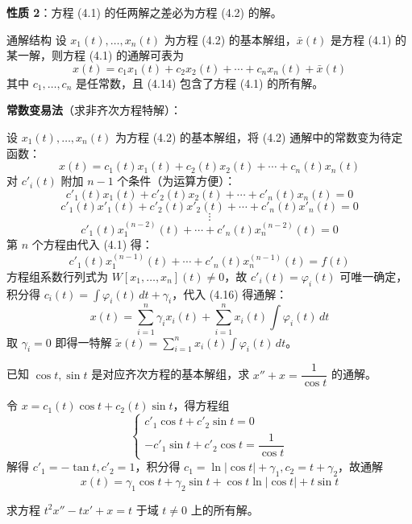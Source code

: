 \textbf{性质 2}：方程 (4.1) 的任两解之差必为方程 (4.2) 的解。

\begin{myTheorem}{通解结构}
设 $x_1(t), \ldots, x_n(t)$ 为方程 (4.2) 的基本解组，$\bar{x}(t)$ 是方程 (4.1) 的某一解，则方程 (4.1) 的通解可表为
\begin{equation}x(t) = c_1x_1(t) + c_2x_2(t) + \cdots + c_nx_n(t) + \bar{x}(t) \tag{4.14}\end{equation}
其中 $c_1, \ldots, c_n$ 是任常数，且 (4.14) 包含了方程 (4.1) 的所有解。
\end{myTheorem}

\textbf{常数变易法}（求非齐次方程特解）：

设 $x_1(t), \ldots, x_n(t)$ 为方程 (4.2) 的基本解组，将 (4.2) 通解中的常数变为待定函数：
\begin{equation}x(t) = c_1(t)x_1(t) + c_2(t)x_2(t) + \cdots + c_n(t)x_n(t) \tag{4.16}\end{equation}
对 $c'_i(t)$ 附加 $n-1$ 个条件（为运算方便）：
$$c'_1(t)x_1(t) + c'_2(t)x_2(t) + \cdots + c'_n(t)x_n(t) = 0$$
$$c'_1(t)x'_1(t) + c'_2(t)x'_2(t) + \cdots + c'_n(t)x'_n(t) = 0$$
$$\vdots$$
$$c'_1(t)x_1^{(n-2)}(t) + \cdots + c'_n(t)x_n^{(n-2)}(t) = 0$$
第 $n$ 个方程由代入 (4.1) 得：
$$c'_1(t)x_1^{(n-1)}(t) + \cdots + c'_n(t)x_n^{(n-1)}(t) = f(t)$$
方程组系数行列式为 $W[x_1, \ldots, x_n](t) \neq 0$，故 $c'_i(t) = \varphi_i(t)$ 可唯一确定，积分得 $c_i(t) = \int \varphi_i(t)\,dt + \gamma_i$，代入 (4.16) 得通解：
$$x(t) = \sum_{i=1}^{n} \gamma_i x_i(t) + \sum_{i=1}^{n} x_i(t)\int \varphi_i(t)\,dt$$
取 $\gamma_i = 0$ 即得一特解 $\tilde{x}(t) = \sum_{i=1}^{n} x_i(t)\int \varphi_i(t)\,dt$。

\begin{example}
已知 $\cos t, \sin t$ 是对应齐次方程的基本解组，求 $x'' + x = \dfrac{1}{\cos t}$ 的通解。
\end{example}

\begin{solution}
令 $x = c_1(t)\cos t + c_2(t)\sin t$，得方程组
$$\begin{cases} c'_1\cos t + c'_2\sin t = 0 \\ -c'_1\sin t + c'_2\cos t = \dfrac{1}{\cos t} \end{cases}$$
解得 $c'_1 = -\tan t, c'_2 = 1$，积分得 $c_1 = \ln|\cos t| + \gamma_1, c_2 = t + \gamma_2$，故通解
$$x(t) = \gamma_1\cos t + \gamma_2\sin t + \cos t\ln|\cos t| + t\sin t$$
\end{solution}

\begin{example}
求方程 $t^2x'' - tx' + x = t$ 于域 $t \neq 0$ 上的所有解。
\end{example}

